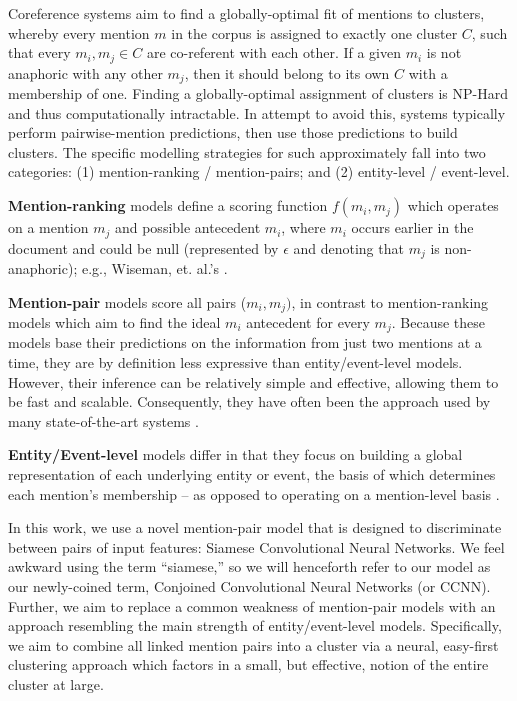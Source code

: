 \documentclass[11pt,a4paper]{article}
\begin{document}
Coreference systems aim to find a globally-optimal fit of mentions to clusters, whereby every mention $m$ in the corpus is assigned to exactly one cluster $C$, such that every ${m_i,m_j} \in C$ are co-referent with each other.  If a given $m_i$ is not anaphoric with any other $m_j$, then it should belong to its own $C$ with a membership of one.  Finding a globally-optimal assignment of clusters is NP-Hard and thus computationally intractable.  In attempt to avoid this, systems typically perform pairwise-mention predictions, then use those predictions to build clusters. The specific modelling strategies for such approximately fall into two categories: (1) mention-ranking / mention-pairs; and (2) entity-level / event-level.

\textbf{Mention-ranking} models define a scoring function $f(m_i,m_j)$ which operates on a mention $m_j$ and possible antecedent $m_i$, where $m_i$ occurs earlier in the document and could be null (represented by $\epsilon$ and denoting that $m_j$ is non-anaphoric); e.g., Wiseman, et. al.'s .

\textbf{Mention-pair} models score all pairs ($m_i,m_j)$, in contrast to mention-ranking models which aim to find the ideal $m_i$ antecedent for every $m_j$.  Because these models base their predictions on the information from just two mentions at a time, they are by definition less expressive than entity/event-level models.  However, their inference can be relatively simple and effective, allowing them to be fast and scalable.  Consequently, they have often been the approach used by many state-of-the-art systems \cite{Soon:2001:MLA:972597.972602,DBLP:conf/emnlp/DurrettK13}.

\textbf{Entity/Event-level} models differ in that they focus on building a global representation of each underlying entity or event, the basis of which determines each mention's membership -- as opposed to operating on a mention-level basis \cite{DBLP:journals/corr/WisemanRS16,clark2016improving}.

In this work, we use a novel mention-pair model that is designed to discriminate between pairs of input features: Siamese Convolutional Neural Networks.  We feel awkward using the term ``siamese,'' so we will henceforth refer to our model as our newly-coined term, Conjoined Convolutional Neural Networks (or CCNN).  Further, we aim to replace a common weakness of mention-pair models with an approach resembling the main strength of entity/event-level models. Specifically, we aim to combine all linked mention pairs into a cluster via a neural, easy-first clustering approach which factors in a small, but effective, notion of the entire cluster at large.
\end{document}
